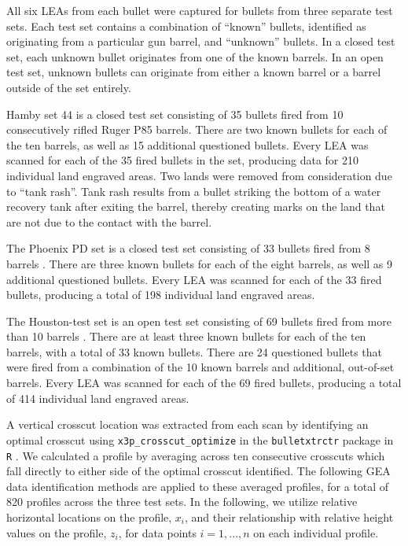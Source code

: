 \documentclass[12pt]{article}
\begin{document}
All six LEAs from each bullet were captured for bullets from three
separate test sets. Each test set contains a combination of ``known''
bullets, identified as originating from a particular gun barrel, and
``unknown'' bullets. In a closed test set, each unknown bullet
originates from one of the known barrels. In an open test set, unknown
bullets can originate from either a known barrel or a barrel outside of
the set entirely.

Hamby set 44 is a closed test set consisting of 35 bullets fired from 10
consecutively rifled Ruger P85 barrels. There are two known bullets for
each of the ten barrels, as well as 15 additional questioned bullets.
Every LEA was scanned for each of the 35 fired bullets in the set,
producing data for 210 individual land engraved areas. Two lands
were removed from consideration due to ``tank rash''. Tank rash results
from a bullet striking the bottom of a water recovery tank after exiting
the barrel, thereby creating marks on the land that are not due to the
contact with the barrel.

The Phoenix PD set is a closed test set consisting of 33 bullets fired
from 8 barrels . There are
three known bullets for each of the eight barrels, as well as 9
additional questioned bullets. Every LEA was scanned for each of the 33
fired bullets, producing a total of 198 individual land engraved areas.

The Houston-test set is an open test set consisting of 69 bullets fired
from more than 10 barrels .
There are at least three known bullets for each of the ten barrels, with
a total of 33 known bullets. There are 24 questioned bullets that were
fired from a combination of the 10 known barrels and additional,
out-of-set barrels. Every LEA was scanned for each of the 69 fired
bullets, producing a total of 414 individual land engraved areas.

A vertical crosscut location was extracted from each scan by identifying
an optimal crosscut using \texttt{x3p\_crosscut\_optimize} in the
\texttt{bulletxtrctr} package in \texttt{R} \cite{bulletxtrctr}. We
calculated a profile by averaging across ten consecutive crosscuts which
fall directly to either side of the optimal crosscut identified. The
following GEA data identification methods are applied to these averaged
profiles, for a total of 820 profiles across the three test sets. In the
following, we utilize relative horizontal locations on the profile,
\(x_i\), and their relationship with relative height values on the
profile, \(z_i\), for data points \(i = 1, ..., n\) on each individual
profile.
\end{document}
